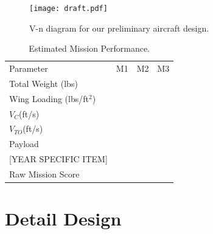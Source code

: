 \documentclass[report]{byu-aero}
\begin{document}
\begin{figure}[h!]
	\centering
	\texttt{[image: draft.pdf]}
	\caption{V-n diagram for our preliminary aircraft design.}
	\label{fig:vndiagram}
\end{figure}

\begin{table}[h!]
	\centering
	\caption{Estimated Mission Performance.}
	\label{tab:estimatedmissionperformance}
	\begin{tabular}{ C{1.5in}  C{1in}  C{1in}  C{1in}}
		
		Parameter & M1 & M2 & M3 \\
		
		Total Weight (lbs) & & &\\
		
		Wing Loading (lbs/ft\(^2\)) & & &\\
		
		\(V_C\)(ft/s) & & &\\
		
		\(V_{TO}\)(ft/s) & & &\\
		
		Payload & & &\\
		
		{\color{\BYUred} {\color{BYUred} [YEAR SPECIFIC ITEM]}} & & &\\
		
		Raw Mission Score & & &\\
		
	\end{tabular}
\end{table}


\clearpage
\newpage

\section{Detail Design} %
\label{sec:detaildesign}
\end{document}
